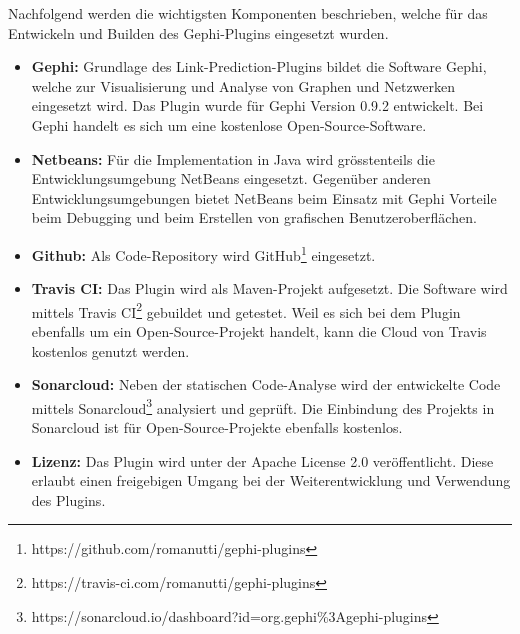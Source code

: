 Nachfolgend werden die wichtigsten Komponenten beschrieben, welche für das Entwickeln und Builden des Gephi-Plugins eingesetzt wurden.

\begin{itemize}
    \item \textbf{Gephi:} Grundlage des Link-Prediction-Plugins bildet die Software Gephi, welche zur Visualisierung und Analyse von Graphen und Netzwerken eingesetzt wird. Das Plugin wurde für Gephi Version 0.9.2 entwickelt. Bei Gephi handelt es sich um eine kostenlose Open-Source-Software.
    \item \textbf{Netbeans:} Für die Implementation in Java wird grösstenteils die Entwicklungsumgebung NetBeans eingesetzt. Gegenüber anderen Entwicklungsumgebungen bietet NetBeans beim Einsatz mit Gephi Vorteile beim Debugging und beim Erstellen von grafischen Benutzeroberflächen.
    \item \textbf{Github:} Als Code-Repository wird GitHub\footnote{https://github.com/romanutti/gephi-plugins} eingesetzt.
    \item \textbf{Travis CI:} Das Plugin wird als Maven-Projekt aufgesetzt. Die Software wird mittels Travis CI\footnote{https://travis-ci.com/romanutti/gephi-plugins} gebuildet und getestet. Weil es sich bei dem Plugin ebenfalls um ein Open-Source-Projekt handelt, kann die Cloud von Travis kostenlos genutzt werden.
    \item \textbf{Sonarcloud:} Neben der statischen Code-Analyse wird der entwickelte Code mittels Sonarcloud\footnote{https://sonarcloud.io/dashboard?id=org.gephi\%3Agephi-plugins} analysiert und geprüft. Die Einbindung des Projekts in Sonarcloud ist für Open-Source-Projekte ebenfalls kostenlos.
    \item \textbf{Lizenz:} Das Plugin wird unter der Apache License 2.0 veröffentlicht. Diese erlaubt einen freigebigen Umgang bei der Weiterentwicklung und Verwendung des Plugins.
\end{itemize}
